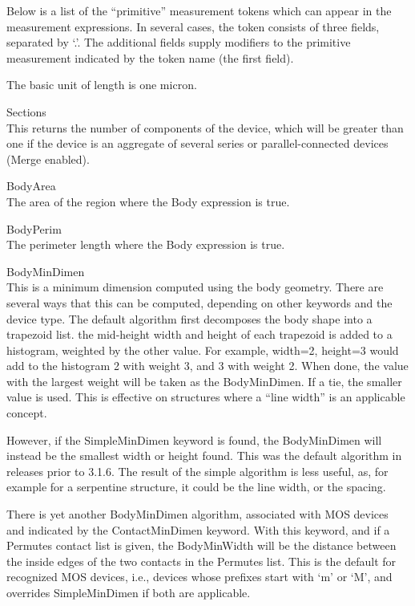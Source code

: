 \begin{description}
\begin{description}
Below is a list of the ``primitive'' measurement tokens which can
appear in the measurement expressions.  In several cases, the token
consists of three fields, separated by `.'.  The additional fields
supply modifiers to the primitive measurement indicated by the token
name (the first field).

The basic unit of length is one micron.

\begin{description}
\item{\et Sections}\\
This returns the number of components of the device, which will be
greater than one if the device is an aggregate of several series or
parallel-connected devices ({\et Merge} enabled).

\item{\et BodyArea}\\
The area of the region where the {\et Body} expression is true.

\item{\et BodyPerim}\\
The perimeter length where the {\et Body} expression is true.

\item{\et BodyMinDimen}\\
This is a minimum dimension computed using the body geometry.  There
are several ways that this can be computed, depending on other
keywords and the device type.  The default algorithm first decomposes
the body shape into a trapezoid list.  the mid-height width and height
of each trapezoid is added to a histogram, weighted by the other
value.  For example, width=2, height=3 would add to the histogram 2
with weight 3, and 3 with weight 2.  When done, the value with the
largest weight will be taken as the {\et BodyMinDimen}.  If a tie, the
smaller value is used.  This is effective on structures where a ``line
width'' is an applicable concept.

However, if the {\et SimpleMinDimen} keyword is found, the {\et
BodyMinDimen} will instead be the smallest width or height found. 
This was the default algorithm in releases prior to 3.1.6.  The result
of the simple algorithm is less useful, as, for example for a
serpentine structure, it could be the line width, or the spacing.

There is yet another {\et BodyMinDimen} algorithm, associated with MOS
devices and indicated by the {\et ContactMinDimen} keyword.  With this
keyword, and if a {\et Permutes} contact list is given, the {\et
BodyMinWidth} will be the distance between the inside edges of the two
contacts in the {\et Permutes} list.  This is the default for
recognized MOS devices, i.e., devices whose prefixes start with `m' or
`M', and overrides {\et SimpleMinDimen} if both are applicable.


\end{description}
\end{description}
\end{description}
